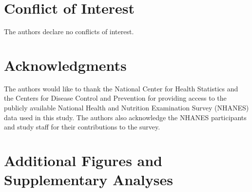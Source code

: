 \documentclass[11pt]{article}
\begin{document}
\section*{Conflict of Interest}
The authors declare no conflicts of interest.


\section*{Acknowledgments}

The authors would like to thank the National Center for Health
Statistics and the Centers for Disease Control and Prevention for
providing access to the publicly available National Health and
Nutrition Examination Survey (NHANES) data used in this study. The
authors also acknowledge the NHANES participants and study staff for
their contributions to the survey.

\listoffigures

\listoftables


\section{Additional Figures and Supplementary Analyses}




\end{document}
